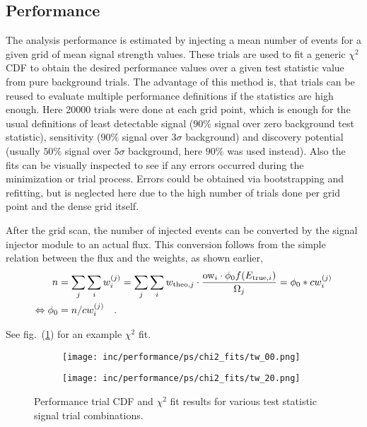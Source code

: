 \subsection{Performance}
The analysis performance is estimated by injecting a mean number of events for a given grid of mean signal strength values.
These trials are used to fit a generic $\chi^2$ CDF to obtain the desired performance values over a given test statistic value from pure background trials.
The advantage of this method is, that trials can be reused to evaluate multiple performance definitions if the statistics are high enough.
Here \num{20000} trials were done at each grid point, which is enough for the usual definitions of least detectable signal ($90\%$ signal over zero background test statistic), sensitivity ($90\%$ signal over $3\sigma$ background) and discovery potential (usually $50\%$ signal over $5\sigma$ background, here $90\%$ was used instead).
Also the fits can be visually inspected to see if any errors occurred during the minimization or trial process.
Errors could be obtained via bootstrapping and refitting, but is neglected here due to the high number of trials done per grid point and the dense grid itself.

After the grid scan, the number of injected events can be converted by the signal injector module to an actual flux.
This conversion follows from the simple relation between the flux and the weights, as shown earlier,
\begin{align}
  n &= \sum_j \sum_i w_i^{(j)}
    = \sum_j \sum_i w_{\mathrm{theo},j} \cdot
              \frac{\mathrm{ow}_i \cdot \phi_0 f(E_{\mathrm{true},i})}
                   {\Omega_j}
    = \phi_0 * c{w}_i^{(j)} \\
  \Leftrightarrow \phi_0 &= n / c{w}_i^{(j)} \quad\text{.}
\end{align}

See fig.~(\ref{fig:performance_chi2}) for an example $\chi^2$ fit.
\begin{figure}[htbp]
  \centering
  \begin{subfigure}[c]{0.45\textwidth}
    \texttt{[image: inc/performance/ps/chi2\_fits/tw\_00.png]}
  \end{subfigure}
  \hfill
  \begin{subfigure}[c]{0.45\textwidth}
    \texttt{[image: inc/performance/ps/chi2\_fits/tw\_20.png]}
  \end{subfigure}
  \caption{Performance trial CDF and $\chi^2$ fit results for various test statistic signal trial combinations.}
  \label{fig:performance_chi2}
\end{figure}

